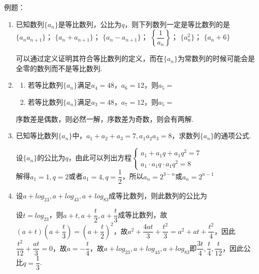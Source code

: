 例题：
\begin{enumerate}
    \item 已知数列$\{a_n\}$是等比数列，公比为$q$，则下列数列一定是等比数列的是\\
         $\{a_n a_{n+1}\}$； $\{a_n+a_{n+1}\}$； $\{a_n-a_{n+1}\}$； $\left\{\dfrac{1}{a_n}\right\}$； $\{a_n^2\}$； $\{a_n + 6\}$
        \begin{jieda}
            可以通过定义证明其符合等比数列的定义，而在$\{a_n\}$为常数列的时候可能会是全零的数列而不是等比数列.
        \end{jieda}
    \item 
    \begin{enumerate}
        \item 若等比数列$\{a_n\}$满足$a_4 = 48$，$a_6 = 12$，则$a_5 = $
        \item 若等比数列$\{a_n\}$满足$a_3 = 48$，$a_7 = 12$，则$a_5 = $
    \end{enumerate}
    \begin{jieda}
        序数差是偶数，则必然一解，序数差为奇数，则会有两解.
    \end{jieda}
    
    \item 已知等比数列$\{a_n\}$中，$a_1 + a_2 + a_3 = 7, a_1a_2a_3 = 8$，求数列$\{a_n\}$的通项公式.
    \begin{jieda}
        设$\{a_n\}$的公比为$q$，由此可以列出方程$\left \{ \begin{array}{l}
             a_1 + a_1q + a_1q^2 = 7  \\
             a_1 \cdot a_1q \cdot a_1q^2 = 8
        \end{array} \right.$ \\
        解得$a_1 = 1, q = 2$或者$a_1 = 4, q = \dfrac{1}{2}$，所以$a_n = 2^{3-n}$或$a_n = 2^{n-1}$
    \end{jieda}
    \item 设$a+log_23, a+log_43, a+log_83$成等比数列，则此数列的公比为
    \begin{jieda}
        设$t = log_23$，则$a+t, a+\dfrac{t}{2}, a+\dfrac{t}{3}$成等比数列，故$(a+t)\left(a+\dfrac{t}{3}\right) = \left(a+\dfrac{t}{2}\right)^2$，故$a^2 + \dfrac{4at}{3} + \dfrac{t^2}{3} = a^2 + at + \dfrac{t^2}{4}$，因此$\dfrac{t^2}{12} + \dfrac{at}{3} = 0$，故$a = -\dfrac{t}{4}$，故$a+log_23, a+log_43, a+log_83$即$\dfrac{3t}{4}, \dfrac{t}{4}, \dfrac{t}{12}$，因此公比$q = \dfrac{1}{3}$.
    \end{jieda}
    

\end{enumerate}
